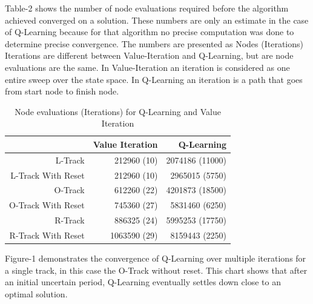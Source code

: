 \documentclass[12pt,letterpaper]{article}
\begin{document}
Table-2 shows the number of node evaluations required before the algorithm achieved converged on a solution. These numbers are only an estimate in the case of Q-Learning because for that algorithm no precise computation was done to determine precise convergence. The numbers are presented as Nodes (Iterations) Iterations are different between Value-Iteration and Q-Learning, but are node evaluations are the same. In Value-Iteration an iteration is considered as one entire sweep over the state space. In Q-Learning an iteration is a path that goes from start node to finish node.

\begin{table}[h]
\begin{tabular}{|r|r|r|}
\hline
           & Value Iteration & Q-Learning \\
\hline
   L-Track & 212960 (10) & 2074186 (11000) \\

L-Track With Reset & 212960 (10) & 2965015 (5750) \\

   O-Track & 612260 (22) & 4201873 (18500) \\

O-Track With Reset & 745360 (27) & 5831460 (6250) \\

   R-Track & 886325 (24) & 5995253 (17750) \\

R-Track With Reset & 1063590 (29) & 8159443 (2250) \\
\hline
\end{tabular}  
 
\caption{Node evaluations (Iterations) for Q-Learning and Value Iteration}
\end{table}



Figure-1 demonstrates the convergence of Q-Learning over multiple iterations for a single track, in this case the O-Track without reset. This chart shows that after an initial uncertain period, Q-Learning eventually settles down close to an optimal solution. 
\end{document}
